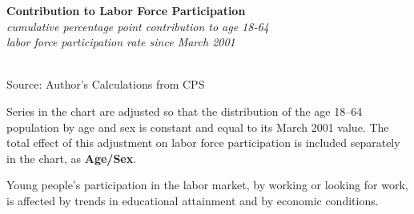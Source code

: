 \documentclass{report}
\makeatletter
\newcommand{\tbllink}[1]{\href{https://raw.githubusercontent.com/bdecon/US-chartbook/master/chartbook/data/#1}{\faTable}}
\newcommand*\short[1]{\expandafter\@gobbletwo\number\numexpr#1\relax}
\newcommand{\absnode}[3]{\node[below right, align=left] at (axis cs: #1,#2) {#3};}
\newcommand{\dateaxisticks}{
		date coordinates in=x, axis line style={draw=none},
		xmax={2022-03-15},
		max space between ticks=40,	    
		xtick={{1990-01-01}, {1992-01-01}, {1994-01-01}, 
			{1996-01-01}, {1998-01-01}, {2000-01-01}, 
			{2002-01-01}, {2004-01-01}, {2006-01-01},
			{2008-01-01}, {2010-01-01}, {2012-01-01}, {2014-01-01},
		    {2016-01-01}, {2018-01-01}, {2020-01-01}, {2022-01-01}, 
		    {2024-01-01}, {2026-01-01}},
		minor xtick={{1989-01-01}, {1991-01-01}, {1993-01-01},
			{1995-01-01}, {1997-01-01}, {1999-01-01}, 
			{2001-01-01}, {2003-01-01}, {2005-01-01}, {2007-01-01},
		    {2009-01-01}, {2011-01-01}, {2013-01-01}, {2015-01-01},
		    {2017-01-01}, {2019-01-01}, {2021-01-01}, {2023-01-01}, 
		    {2025-01-01}, {2027-01-01}},
		enlarge y limits={0.06}, enlarge x limits={0.01},
		}
\newcommand{\bbar}[2]{extra #1 ticks = {{#2}}, extra #1 tick labels = ,
		extra #1 tick style = {grid=major, grid style={thick, black!25}},}
\newcommand{\stdline}[4]{\addplot[very thick, no markers, color=#1] 
		table [x=#2, y=#3, col sep=comma] {#4};	}
\newcommand{\thickline}[4]{\addplot[ultra thick, no markers, color=#1] 
		table [x=#2, y=#3, col sep=comma] {#4};	}
\newcommand{\rebars}{
		\fill[color=black!10] (axis cs:{2007-12-01},\pgfkeysvalueof{/pgfplots/ymin}) rectangle 
			(axis cs:{2009-07-01}, \pgfkeysvalueof{/pgfplots/ymax});
		\fill[color=black!10] (axis cs:{2001-03-01},\pgfkeysvalueof{/pgfplots/ymin}) rectangle 
			(axis cs:{2001-11-01}, \pgfkeysvalueof{/pgfplots/ymax});
		\fill[color=black!10] (axis cs:{2020-02-01},\pgfkeysvalueof{/pgfplots/ymin}) rectangle 
			(axis cs:{2020-05-01}, \pgfkeysvalueof{/pgfplots/ymax});}
\makeatother
\begin{document}
{{\begin{minipage}{0.29\textwidth}
\small  
\end{minipage} \hspace{5mm}
\begin{minipage}{0.42\textwidth}
\normalsize \textbf{Contribution to Labor Force Participation}\\
\footnotesize{\textit{cumulative percentage point contribution to age 18-64}}\\
\footnotesize{\textit{labor force participation rate since March 2001}}\\
\hspace*{-3mm} \\
\footnotesize{Source: Author's Calculations from CPS} \hfill \tbllink{nilf.csv}

\footnotesize Series in the chart are adjusted so that the distribution of the age 18--64 population by age and sex is constant and equal to its March 2001 value. The total effect of this adjustment on labor force participation is included separately in the chart, as \color{violet!80!purple}\textbf{Age/Sex}.
\end{minipage}
\newpage
\begin{minipage}{0.76\textwidth}
\small Young people's participation in the labor market, by working or looking for work, is affected by trends in educational attainment and by economic conditions. 
\vspace{2mm}


\end{minipage}}}
\end{document}
